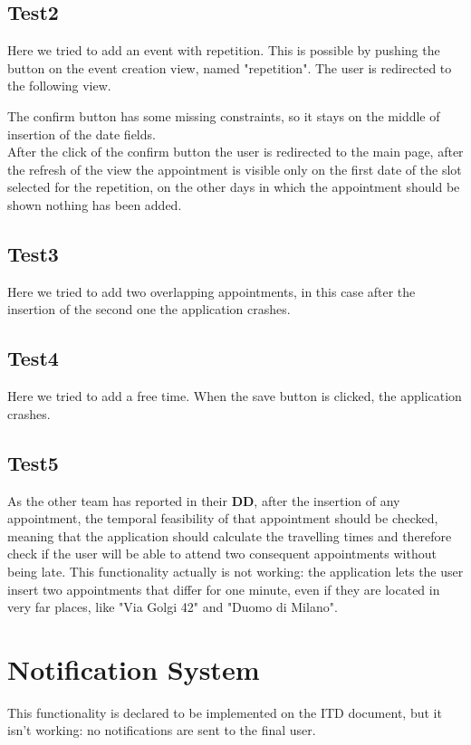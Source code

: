 \subsection{Test2}
Here we tried to add an event with repetition. This is possible by pushing the button on the event creation view, named "repetition". The user is redirected to the following view.


The confirm button has some missing constraints, so it stays on the middle of insertion of the date fields.\\
After the click of the confirm button the user is redirected to the main page, after the refresh of the view the appointment is visible only on the first date of the slot selected for the repetition, on the other days in which the appointment should be shown nothing has been added.

\subsection{Test3}
Here we tried to add two overlapping appointments, in this case after the insertion of the second one the application crashes.

\subsection{Test4}
Here we tried to add a free time. When the save button is clicked, the application crashes.

\subsection{Test5}
As the other team has reported in their \textbf{DD}, after the insertion of any appointment, the temporal feasibility of that appointment should be checked, meaning that the application should calculate the travelling times and therefore check if the user will be able to attend two consequent appointments without being late.
This functionality actually is not working: the application lets the user insert two appointments that differ for one minute, even if they are located in very far places, like "Via Golgi 42" and "Duomo di Milano".


\section{Notification System}
This functionality is declared to be implemented on the ITD document, but it isn't working: no notifications are sent to the final user.

